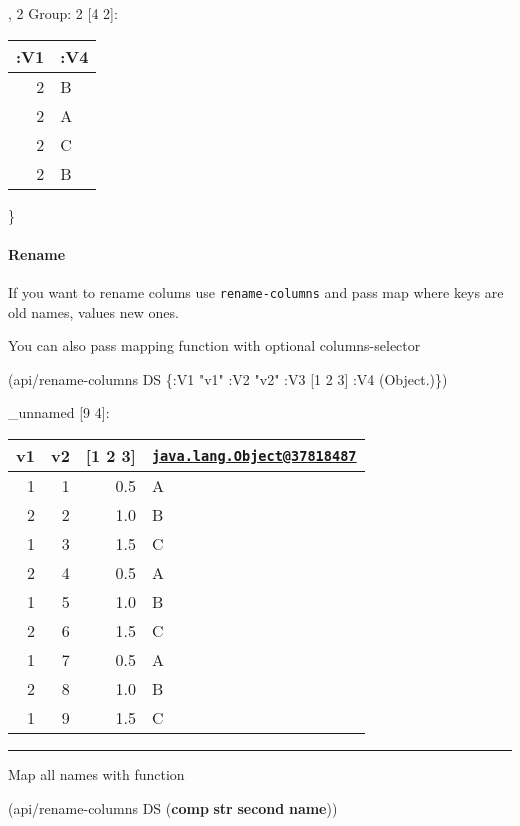 \documentclass[]{article}
\newenvironment{Shaded}{\begin{snugshade}}{\end{snugshade}}
\newcommand{\KeywordTok}[1]{\textcolor[rgb]{0.13,0.29,0.53}{\textbf{#1}}}
\newcommand{\DecValTok}[1]{\textcolor[rgb]{0.00,0.00,0.81}{#1}}
\newcommand{\StringTok}[1]{\textcolor[rgb]{0.31,0.60,0.02}{#1}}
\newcommand{\AttributeTok}[1]{\textcolor[rgb]{0.77,0.63,0.00}{#1}}
\newcommand{\NormalTok}[1]{#1}
\let\oldparagraph\paragraph
\renewcommand{\paragraph}[1]{\oldparagraph{#1}\mbox{}}
\begin{document}
, 2 Group: 2 {[}4 2{]}:

\begin{longtable}[]{@{}rl@{}}
\toprule
:V1 & :V4\tabularnewline
\midrule
\endhead
2 & B\tabularnewline
2 & A\tabularnewline
2 & C\tabularnewline
2 & B\tabularnewline
\bottomrule
\end{longtable}

\}

\paragraph{Rename}\label{rename}

If you want to rename colums use \texttt{rename-columns} and pass map
where keys are old names, values new ones.

You can also pass mapping function with optional columns-selector

\begin{Shaded}
\begin{Highlighting}[]
\NormalTok{(api/rename-columns DS \{}\AttributeTok{:V1} \StringTok{"v1"}
                        \AttributeTok{:V2} \StringTok{"v2"}
                        \AttributeTok{:V3}\NormalTok{ [}\DecValTok{1} \DecValTok{2} \DecValTok{3}\NormalTok{]}
                        \AttributeTok{:V4}\NormalTok{ (Object.)\})}
\end{Highlighting}
\end{Shaded}

\_unnamed {[}9 4{]}:

\begin{longtable}[]{@{}rrrl@{}}
\toprule
v1 & v2 & {[}1 2 3{]} &
\href{mailto:java.lang.Object@37818487}{\nolinkurl{java.lang.Object@37818487}}\tabularnewline
\midrule
\endhead
1 & 1 & 0.5 & A\tabularnewline
2 & 2 & 1.0 & B\tabularnewline
1 & 3 & 1.5 & C\tabularnewline
2 & 4 & 0.5 & A\tabularnewline
1 & 5 & 1.0 & B\tabularnewline
2 & 6 & 1.5 & C\tabularnewline
1 & 7 & 0.5 & A\tabularnewline
2 & 8 & 1.0 & B\tabularnewline
1 & 9 & 1.5 & C\tabularnewline
\bottomrule
\end{longtable}

\begin{center}\rule{0.5\linewidth}{0.5pt}\end{center}

Map all names with function

\begin{Shaded}
\begin{Highlighting}[]
\NormalTok{(api/rename-columns DS (}\KeywordTok{comp} \KeywordTok{str} \KeywordTok{second} \KeywordTok{name}\NormalTok{))}
\end{Highlighting}
\end{Shaded}
\end{document}
